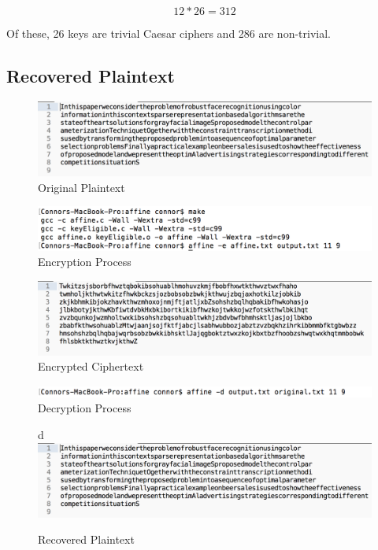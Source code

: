 \documentclass[]{article}
\begin{document}
$$12*26=312$$

Of these, 26 keys are trivial Caesar ciphers and 286 are non-trivial.

\subsection*{Recovered Plaintext}

\begin{figure}[H]
	\includegraphics[width=\textwidth]{affine_plaintext.png}
	\caption{Original Plaintext}
	\centering
\end{figure}

\begin{figure}[H]
	\includegraphics[width=\textwidth]{affine_encrypt.png}
	\caption{Encryption Process}
	\centering
\end{figure}

\begin{figure}[H]
	\includegraphics[width=\textwidth]{affine_ciphertext.png}
	\caption{Encrypted Ciphertext}
	\centering
\end{figure}

\begin{figure}[H]
	\includegraphics[width=\textwidth]{affine_decrypt.png}
	\caption{Decryption Process}
	\centering
\end{figure}

\begin{figure}[H]
d	\includegraphics[width=\textwidth]{affine_plaintext.png}
	\caption{Recovered Plaintext}
	\centering
\end{figure}
\end{document}
